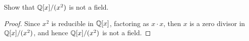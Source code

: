 \documentclass[../hw7]{subfiles}
\begin{document}
\begin{problem}
Show that $\mathbb{Q}[x]/(x^2)$ is not a field.
\end{problem}
\begin{proof}
	Since $x^2$ is reducible in $\mathbb{Q}[x]$, factoring as $x\cdot x$, then $x$ is a zero divisor in  $\mathbb{Q}[x]/(x^2)$, and hence $\mathbb{Q}[x]/(x^2)$ is not a field.
\end{proof}
\end{document}
